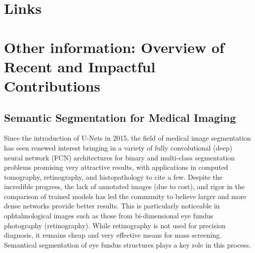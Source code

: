 \documentclass[11pt,a4paper,sans]{moderncv}
\begin{document}

\section{Links}


\section{Other information: Overview of Recent and Impactful Contributions}

\subsection{Semantic Segmentation for Medical Imaging}

Since the introduction of U-Nets in 2015, the field of medical image
segmentation has seen renewed interest bringing in a variety of fully
convolutional (deep) neural network (FCN) architectures for binary and
multi-class segmentation problems promising very attractive results, with
applications in computed tomography, retinography, and histopathology to cite a
few.  Despite the incredible progress, the lack of annotated images (due to
cost), and rigor in the comparison of trained models has led the community to
believe larger and more dense networks provide better results.  This is
particularly noticeable in ophtalmological images such as those from
bi-dimensional eye fundus photography (retinography).  While retinography is
not used for precision diagnosis, it remains cheap and very effective means for
mass screening.  Semantical segmentation of eye fundus structures plays a key
role in this process.
\end{document}
